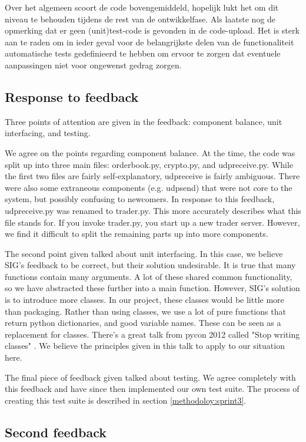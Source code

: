 Over het algemeen scoort de code bovengemiddeld, hopelijk lukt het om dit niveau te behouden tijdens de rest van de ontwikkelfase.
Als laatste nog de opmerking dat er geen (unit)test-code is gevonden in de code-upload.
Het is sterk aan te raden om in ieder geval voor de belangrijkste delen van de functionaliteit automatische tests gedefinieerd te hebben om ervoor te zorgen dat eventuele aanpassingen niet voor ongewenst gedrag zorgen.

\subsection{Response to feedback}
Three points of attention are given in the feedback: component balance, unit interfacing, and testing.

We agree on the points regarding component balance.
At the time, the code was split up into three main files: orderbook.py, crypto.py, and udpreceive.py.
While the first two files are fairly self-explanatory, udpreceive is fairly ambiguous.
There were also some extraneous components (e.g. udpsend) that were not core to the system, but possibly confusing to newcomers.
In response to this feedback, udpreceive.py was renamed to trader.py.
This more accurately describes what this file stands for.
If you invoke trader.py, you start up a new trader server.
However, we find it difficult to split the remaining parts up into more components.

The second point given talked about unit interfacing.
In this case, we believe SIG's feedback to be correct, but their solution undesirable.
It is true that many functions contain many arguments.
A lot of these shared common functionality, so we have abstracted these further into a main function.
However, SIG's solution is to introduce more classes.
In our project, these classes would be little more than packaging.
Rather than using classes, we use a lot of pure functions that return python dictionaries, and good variable names.
These can be seen as a replacement for classes.
There's a great talk from pycon 2012 called "Stop writing classes" \cite{noclassesvid}.
We believe the principles given in this talk to apply to our situation here.

The final piece of feedback given talked about testing.
We agree completely with this feedback and have since then implemented our own test suite.
The process of creating this test suite is described in section \ref{methodoloy:sprint3}.

\subsection{Second feedback}

